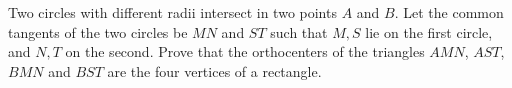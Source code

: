 Two circles with different radii intersect in two points $A$ and $B$. Let the common tangents of the two circles be $MN$ and $ST$ such that $M,S$ lie on the first circle, and $N,T$ on the second. Prove that the orthocenters of the triangles $AMN$,  $AST$,  $BMN$ and $BST$ are the four vertices of a rectangle.